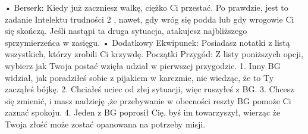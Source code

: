     • Berserk: Kiedy już zaczniesz walkę, ciężko Ci przestać. Po prawdzie, jest to zadanie Intelektu trudności 2 , nawet, gdy wróg się podda lub gdy wrogowie Ci się skończą. Jeśli nastąpi ta druga sytuacja, atakujesz najbliższego sprzymierzeńca w zasięgu.
    • Dodatkowy Ekwipunek: Posiadasz notatki z listą wszystkich, którzy zrobili Ci krzywdę.
Początki Przygód: Z listy poniższych opcji, wybierz jak Twoja postać wzięła udział w pierwszej przygodzie.
1. Inny BG widział, jak poradziłeś sobie z pijakiem w karczmie, nie wiedząc, że to Ty zacząłeś bójkę.
2. Chciałeś uciec od złej sytuacji, więc ruszyłeś z BG.
3. Chcesz się zmienić, i masz nadzieję ,że przebywanie w obecności reszty BG pomoże Ci zaznać spokoju.
4. Jeden z BG poprosił Cię, byś im towarzyszył, wierząc że Twoja złość może zostać opanowana na potrzeby misji.